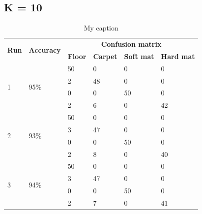 \documentclass[USenglish]{ifimaster}  %
\begin{document}
\subsection{K = 10}
\begin{table}[h]
	\centering
	\begin{tabular}{llllll}
		\hline
		\multirow{2}{*}{\textbf{Run}} & \multirow{2}{*}{\textbf{Accuracy}} & \multicolumn{4}{c}{\textbf{Confusion matrix}} \\ \cline{3-6} 
		&  & \multicolumn{1}{l|}{\textbf{Floor}} & \multicolumn{1}{l|}{\textbf{Carpet}} & \multicolumn{1}{l|}{\textbf{Soft mat}} & \textbf{Hard mat} \\ \hline
		\multicolumn{1}{l|}{\multirow{4}{*}{1}} & \multicolumn{1}{l|}{\multirow{4}{*}{95\%}} & \multicolumn{1}{l|}{50} & \multicolumn{1}{l|}{0} & \multicolumn{1}{l|}{0} & 0 \\ \cline{3-6} 
		\multicolumn{1}{l|}{} & \multicolumn{1}{l|}{} & \multicolumn{1}{l|}{2} & \multicolumn{1}{l|}{48} & \multicolumn{1}{l|}{0} & 0 \\ \cline{3-6} 
		\multicolumn{1}{l|}{} & \multicolumn{1}{l|}{} & \multicolumn{1}{l|}{0} & \multicolumn{1}{l|}{0} & \multicolumn{1}{l|}{50} & 0 \\ \cline{3-6} 
		\multicolumn{1}{l|}{} & \multicolumn{1}{l|}{} & \multicolumn{1}{l|}{2} & \multicolumn{1}{l|}{6} & \multicolumn{1}{l|}{0} & 42 \\ \hline
		\multicolumn{1}{l|}{\multirow{4}{*}{2}} & \multicolumn{1}{l|}{\multirow{4}{*}{93\%}} & \multicolumn{1}{l|}{50} & \multicolumn{1}{l|}{0} & \multicolumn{1}{l|}{0} & 0 \\ \cline{3-6} 
		\multicolumn{1}{l|}{} & \multicolumn{1}{l|}{} & \multicolumn{1}{l|}{3} & \multicolumn{1}{l|}{47} & \multicolumn{1}{l|}{0} & 0 \\ \cline{3-6} 
		\multicolumn{1}{l|}{} & \multicolumn{1}{l|}{} & \multicolumn{1}{l|}{0} & \multicolumn{1}{l|}{0} & \multicolumn{1}{l|}{50} & 0 \\ \cline{3-6} 
		\multicolumn{1}{l|}{} & \multicolumn{1}{l|}{} & \multicolumn{1}{l|}{2} & \multicolumn{1}{l|}{8} & \multicolumn{1}{l|}{0} & 40 \\ \hline
		\multicolumn{1}{l|}{\multirow{4}{*}{3}} & \multicolumn{1}{l|}{\multirow{4}{*}{94\%}} & \multicolumn{1}{l|}{50} & \multicolumn{1}{l|}{0} & \multicolumn{1}{l|}{0} & 0 \\ \cline{3-6} 
		\multicolumn{1}{l|}{} & \multicolumn{1}{l|}{} & \multicolumn{1}{l|}{3} & \multicolumn{1}{l|}{47} & \multicolumn{1}{l|}{0} & 0 \\ \cline{3-6} 
		\multicolumn{1}{l|}{} & \multicolumn{1}{l|}{} & \multicolumn{1}{l|}{0} & \multicolumn{1}{l|}{0} & \multicolumn{1}{l|}{50} & 0 \\ \cline{3-6} 
		\multicolumn{1}{l|}{} & \multicolumn{1}{l|}{} & \multicolumn{1}{l|}{2} & \multicolumn{1}{l|}{7} & \multicolumn{1}{l|}{0} & 41
	\end{tabular}
	\caption{My caption}
	\label{my-label}
\end{table}
\FloatBarrier
\end{document}
